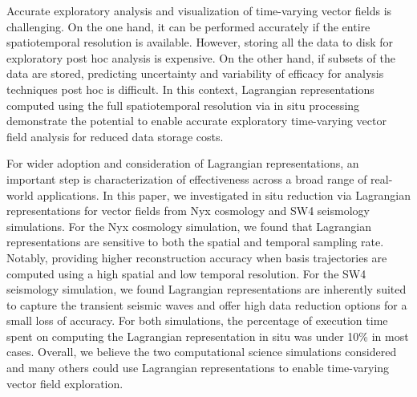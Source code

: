Accurate exploratory analysis and visualization of time-varying vector fields is challenging.
%
On the one hand, it can be performed accurately if the entire spatiotemporal resolution is available.
%
However, storing all the data to disk for exploratory post hoc analysis is expensive.
%
On the other hand, if subsets of the data are stored, predicting uncertainty and variability of efficacy for analysis techniques post hoc is difficult.
%
In this context, Lagrangian representations computed using the full spatiotemporal resolution via in situ processing demonstrate the potential to enable accurate exploratory time-varying vector field analysis for reduced data storage costs.



For wider adoption and consideration of Lagrangian representations, an important step is characterization of effectiveness across a broad range of real-world applications.
%
In this paper, we investigated in situ reduction via Lagrangian representations for vector fields from Nyx cosmology and SW4 seismology simulations.
%
For the Nyx cosmology simulation, we found that Lagrangian representations are sensitive to both the spatial and temporal sampling rate.
%
Notably, providing higher reconstruction accuracy when basis trajectories are computed using a high spatial and low temporal resolution.
%
For the SW4 seismology simulation, we found Lagrangian representations are inherently suited to capture the transient seismic waves and offer high data reduction options for a small loss of accuracy.
%
For both simulations, the percentage of execution time spent on computing the Lagrangian representation in situ was under 10\% in most cases.
%
Overall, we believe the two computational science simulations considered and many others could use Lagrangian representations to enable time-varying vector field exploration. 
